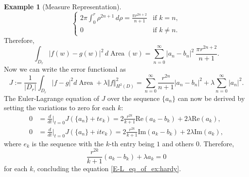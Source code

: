 \documentclass{amsart}
\numberwithin{equation}{section}
\DeclareMathOperator{\Area}{Area}
\renewcommand{\Re}{\text{Re}}
\renewcommand{\Im}{\text{Im}}
\theoremstyle{plain}
\theoremstyle{remark}
\theoremstyle{definition}
\newtheorem{example}[subsection]{Example}
\begin{document}
\begin{example}[Measure Representation]
\begin{equation}
\begin{cases}
\displaystyle 2\pi \int_0^r \rho^{2n+1} \, d\rho = \frac{\pi r^{2n+2}}{n+1} & \text{if } k = n, \\
0 & \text{if } k \neq n.
\end{cases}
\end{equation}
Therefore, 
$$
\int_{D_r} |f(w) - g(w)|^2 \, d\Area(w) = \sum_{n=0}^\infty |a_n - b_n|^2 \  \frac{\pi r^{2n+2}}{n+1}.
$$
Now we can write the error functional as
$$
J := \frac{1}{|D_r|}\int_{D_r} |f-g|^2  d\Area + \lambda \Vert f \Vert^2_{H^2(D)} = \sum_{n=0}^\infty \frac{ r^{2n}}{n+1} |a_n - b_n|^2+ \lambda \sum_{n=0}^\infty |a_n|^2.
$$
The Euler-Lagrange equation of $J$ over the sequence $\{a_n\}$ can now be derived by setting the variations to zero for each $k$:
\begin{align*}
    0&=\frac{d}{dt}|_{t=0} J(\{a_n\}+te_k)=2\frac{r^{2k}}{k+1}\Re(a_k-b_k)+2\lambda \Re (a_k),\\
    0&=\frac{d}{dt}|_{t=0} J(\{a_n\}+ite_k)=2\frac{r^{2k}}{k+1}\Im(a_k-b_k)+2\lambda \Im (a_k),
\end{align*}
where $e_k$ is the sequence with the $k$-th entry being $1$ and others $0$.
Therefore,
\begin{equation*}
    \frac{r^{2k}}{k+1}(a_k-b_k)+\lambda a_k=0
\end{equation*}
for each $k$, concluding the equation \eqref{E-L_eq_of_ex:hardy}.




\end{example}
\end{document}
